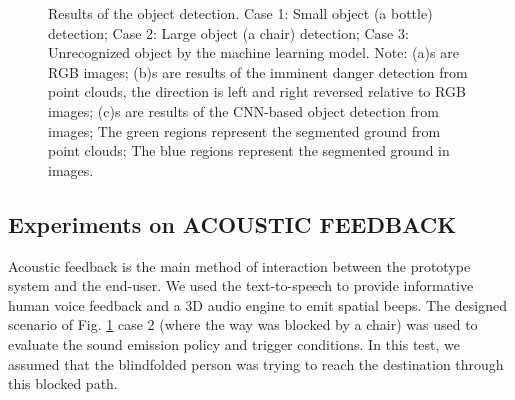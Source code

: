 \documentclass{ieeeaccess}
\begin{document}
\begin{figure}
    \centering
    \captionsetup[subfigure]{labelformat=empty}
    \qquad
    \qquad
    \caption{Results of the object detection. Case 1: Small object (a bottle) detection; Case 2: Large object (a chair) detection; Case 3: Unrecognized object by the machine learning model. Note: (a)s are RGB images; (b)s are results of the imminent danger detection from point clouds, the direction is left and right  reversed relative to RGB images; (c)s are results of the CNN-based object detection from images; The green regions represent the segmented ground from point clouds; The blue regions represent the segmented ground in images.}%
    \label{fig:objectdetection}
\end{figure}

\subsection{Experiments on ACOUSTIC FEEDBACK}

Acoustic feedback is the main method of interaction between the prototype system and the end-user. We used the text-to-speech to provide informative human voice feedback and a 3D audio engine to emit spatial beeps. The designed scenario of Fig. \ref{fig:objectdetection} case 2 (where the way was blocked by a chair) was used to evaluate the sound emission policy and trigger conditions. In this test, we assumed that the blindfolded person 
was trying to reach the destination through this blocked path.
\end{document}

